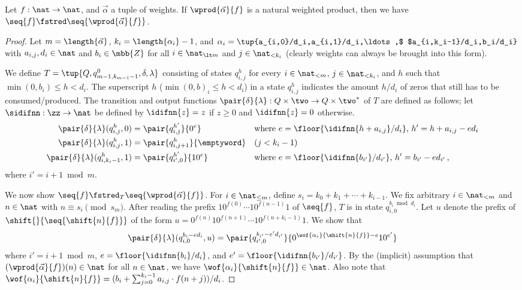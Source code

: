 \begin{lemma}\label{lem:wprod:FST}
  Let $f : \nat \to \nat$, and $\vec{\alpha}$ a tuple of weights.
  If ${\wprod{\vec{\alpha}}{f}}$ is a natural weighted product, then we have
  $\seq{f} \fstred \seq{\wprod{\vec{\alpha}}{f}}$.
\end{lemma}
\begin{proof}Let $m = \length{\vec{\alpha}}$, $k_i = \length{\alpha_i} - 1$,
  and $\alpha_i = \tup{a_{i,0}/d_i,a_{i,1}/d_i,\ldots,$ $a_{i,k_i-1}/d_i,b_i/d_i}$
  with $a_{i,j},d_i \in \nat$ and $b_i \in \mbb{Z}$ for all $i \in \nat_{\lt m}$ and $j \in \nat_{<k_i}$
  (clearly weights can always be brought into this form).

  We define $T = \tup{Q,q_{m-1,k_{m-1}-1}^{0},\delta,\lambda}$
  consisting of states $q_{i,j}^{h}$ for every $i \in \nat_{<m}$, $j \in \nat_{<k_i}$, 
  and $h$ such that $\min(0,b_i) \le h \lt d_i$.
  The superscript $h$ ($\min(0,b)_i \le h \lt d_i$) in a state $q_{i,j}^h$
  indicates the amount $h/d_i$ of zeros that still has to be consumed/produced.
The transition and output functions
  $\pair{\delta}{\lambda} : Q \times \two \to Q \times \two^*$ of $T$ 
  are defined as follows; 
  let $\sidifnn : \zz \to \nat$ be defined by $\idifnn{z} = z$ if $z \ge 0$ and $\idifnn{z} = 0$ otherwise.
  \begin{align*}
    \pair{\delta}{\lambda}(q_{i,j}^{h},0) & = \pair{q_{i,j}^{h'}}{0^e} 
    && \text{where $e = \floor{\idifnn{h + a_{i,j}}/d_i}$, $h' = h + a_{i,j} - e d_i$}\\
    \pair{\delta}{\lambda}(q_{i,j}^{h},1) & = \pair{q_{i,j+1}^{h}}{\emptyword}
    && (j < k_i - 1) \\
    \pair{\delta}{\lambda}(q_{i,k_i-1}^{h},1) & = \pair{q_{i',0}^{h'}}{1 0^e} 
    && \text{where $e = \floor{\idifnn{b_{i'}}/d_{i'}}$, $h' = b_{i'} - e d_{i'}$\,,}
  \end{align*}
  where $i' = i+1 \bmod{m}$.


  We now show $\seq{f} \fstred_T \seq{\wprod{\vec{\alpha}}{f}}$.
  For $i \in \nat_{\le m}$, define $s_i = k_0 + k_1 + \cdots + k_{i-1}$. We fix arbitrary $i \in \nat_{<m}$ and $n \in \nat$ with $n \equiv s_i \pmod{s_m}$.
  After reading the prefix $10^{f(0)} \cdots 10^{f(n-1)} 1$ of $\seq{f}$,
  $T$ is in state $q_{i,0}^{b_i \bmod{d_i}}$.
Let $u$ denote the prefix of $\shift{}{\seq{\shift{n}{f}}}$  of the form $u = 0^{f(n)} 1 0^{f(n+1)} \cdots 1 0^{f(n+k_i-1)} 1$.
  We show that 
  \begin{align}
    \pair{\delta}{\lambda}(q_{i,0}^{b_i - e d_i},u) = \pair{q_{i',0}^{b_{i'} - e' d_{i'}}}{0^{\wof{\alpha_i}{\shift{n}{f}}-e} 1 0^{e'}}
\label{eq:lem:wprod:FST:i}
  \end{align}
  where $i' = i+1 \bmod{m}$, 
  $e = \floor{\idifnn{b_{i}}/d_{i}}$, and
  $e' = \floor{\idifnn{b_{i'}}/d_{i'}}$.
  By the (implicit) assumption that $(\wprod{\vec{\alpha}}{f})(n) \in \nat$ for all $n \in \nat$,
  we have $\wof{\alpha_i}{\shift{n}{f} } \in \nat$.
  Also note that
  $\wof{\alpha_i}{\shift{n}{f}} = (b_i + \sum_{j=0}^{k_i-1}a_{i,j} \cdot f(n + j))/d_i$.



\end{proof}
